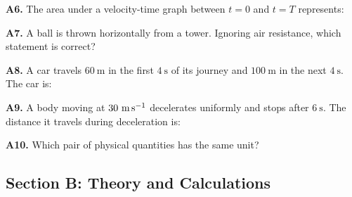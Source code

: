\begin{exercisebox}[3]
\vspace{0.4cm}

\textbf{A6.} The area under a velocity-time graph
between $t = 0$ and $t = T$ represents:


\vspace{0.4cm}

\textbf{A7.} A ball is thrown horizontally from a tower.
Ignoring air resistance, which statement is correct?


\vspace{0.4cm}

\textbf{A8.} A car travels $60\ \text{m}$ in the first
$4\ \text{s}$ of its journey and $100\ \text{m}$ in the
next $4\ \text{s}$. The car is:


\vspace{0.4cm}

\textbf{A9.} A body moving at $30\ \text{m\,s}^{-1}$
decelerates uniformly and stops after $6\ \text{s}$.
The distance it travels during deceleration is:


\vspace{0.4cm}

\textbf{A10.} Which pair of physical quantities has the
same unit?


\vspace{0.6cm}

\subsection*{Section B: Theory and Calculations}


\end{exercisebox}
